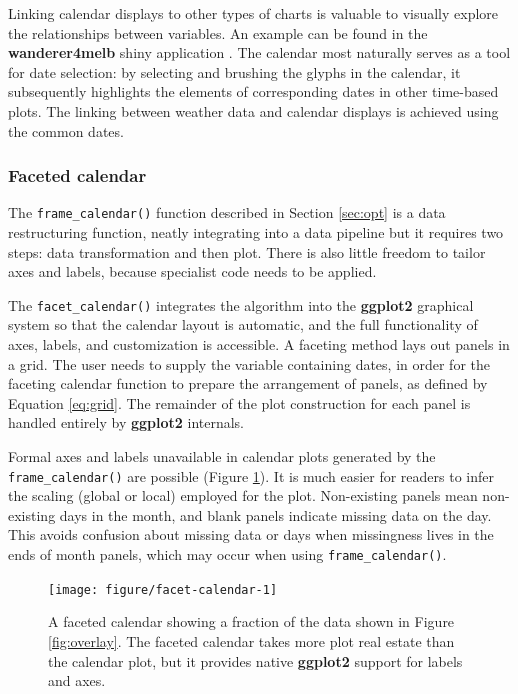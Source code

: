 \documentclass[12pt]{article}
\begin{document}
Linking calendar displays to other types of charts is valuable to visually explore the relationships between variables. An example can be found in the \textbf{wanderer4melb} shiny application \citep{R-wanderer4melb}. The calendar most naturally serves as a tool for date selection: by selecting and brushing the glyphs in the calendar, it subsequently highlights the elements of corresponding dates in other time-based plots. The linking between weather data and calendar displays is achieved using the common dates.

\hypertarget{sec:facet-calendar}{%
\subsubsection{Faceted calendar}\label{sec:facet-calendar}}

The \texttt{frame\_calendar()} function described in Section \ref{sec:opt} is a data restructuring function, neatly integrating into a data pipeline but it requires two steps: data transformation and then plot. There is also little freedom to tailor axes and labels, because specialist code needs to be applied.

The \texttt{facet\_calendar()} integrates the algorithm into the \textbf{ggplot2} graphical system so that the calendar layout is automatic, and the full functionality of axes, labels, and customization is accessible. A faceting method lays out panels in a grid. The user needs to supply the variable containing dates, in order for the faceting calendar function to prepare the arrangement of panels, as defined by Equation \eqref{eq:grid}. The remainder of the plot construction for each panel is handled entirely by \textbf{ggplot2} internals.

Formal axes and labels unavailable in calendar plots generated by the \texttt{frame\_calendar()} are possible (Figure \ref{fig:facet-calendar}). It is much easier for readers to infer the scaling (global or local) employed for the plot. Non-existing panels mean non-existing days in the month, and blank panels indicate missing data on the day. This avoids confusion about missing data or days when missingness lives in the ends of month panels, which may occur when using \texttt{frame\_calendar()}.

\begin{figure}

{\centering \texttt{[image: figure/facet-calendar-1]} 

}

\caption{A faceted calendar showing a fraction of the data shown in Figure \ref{fig:overlay}. The faceted calendar takes more plot real estate than the calendar plot, but it provides native \textbf{ggplot2} support for labels and axes.}\label{fig:facet-calendar}
\end{figure}
\end{document}
